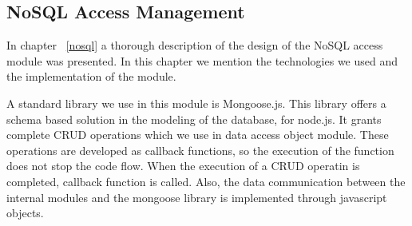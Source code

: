 \subsection{NoSQL Access Management}
In chapter ~\ref{nosql} a thorough description of the design of the NoSQL access module was presented. In this chapter we mention the technologies we used and the implementation of the module. \par
	A standard library we use in this module is Mongoose.js. This library offers  a schema based solution in the modeling of the database, for node.js. It grants complete CRUD operations which we use in data access object module. These operations are developed as callback functions, so the execution of the function does not stop the code flow. When the execution of a CRUD operatin is completed, callback function is called. Also, the data communication between the internal modules and the mongoose library is implemented through javascript objects.

